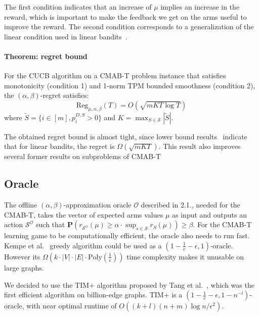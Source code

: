 \documentclass[a4paper,12pt]{article}
\begin{document}
The first condition indicates that an increase of $\mu$ implies an increase in the reward, which is important to make the feedback we get on the arms useful to improve the reward. The second condition corresponds to a generalization of the linear condition used in linear bandits~\cite{kveton2015tight}.

\paragraph{Theorem: regret bound}
For the CUCB algorithm on a CMAB-T problem instance that satisfies monotonicity (condition 1) and 1-norm TPM bounded smoothness (condition 2), the $(\alpha, \beta)$-regret satisfies:
\begin{equation}
 \text{Reg}_{\mu, \alpha, \beta}(T) = O(\sqrt{mKT\log T})
\end{equation}
where $\tilde{S} = \{i\in[m], p_i^{D, S} > 0\}$ and $K = \max_{S\in\mathcal{S}}|\tilde{S}|$.

The obtained regret bound is almost tight, since lower bound results~\cite{kveton2015tight} indicate that for linear bandits, the regret is $\Omega(\sqrt{mKT})$. This result also improves several former results on subproblems of CMAB-T~\cite{chen2016combinatorial,kveton2015tight,kveton2015combinatorial,wen2016online}

\subsection{Oracle}
\label{sscn:oracle}

The offline $(\alpha, \beta)$-approximation oracle $\mathcal{O}$ described in 2.1., needed for the CMAB-T, takes the vector of expected arms values $\mu$ as input and outputs an action $\mathcal{S}^{\mathcal{O}}$ such that $\mathbf{P}(r_{\mathcal{S}^{\mathcal{O}}}(\mathcal{\mu}) \geq \alpha\cdot\sup_{s\in\mathcal{S}}r_S(\mu)) \geq \beta$.
For the CMAB-T learning game to be computationally efficient, the oracle also needs to run fast. Kempe et al.~\cite{kempe2003maximizing} greedy algorithm could be used as a $(1 - \frac{1}{e} - \epsilon, 1)$-oracle. However its $\Omega(k\cdot|V|\cdot|E|\cdot\text{Poly}(\frac{1}{\epsilon}))$ time complexity makes it unusable on large graphs.

We decided to use the TIM+ algorithm proposed by Tang et al.~\cite{tang2014influence}, which was the first efficient algorithm on billion-edge graphs. TIM+ is a $(1-\frac{1}{e}-\epsilon, 1-n^{-l})$-oracle, with near optimal runtime of $O((k + l)(n + m) \log n/\epsilon^2)$.
\end{document}
